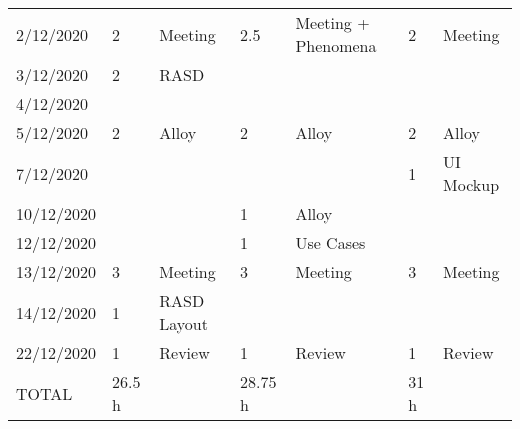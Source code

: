 \begin{table}[h]
{\begin{tabular}{|l|l|p{2.5cm}|l|p{2.5cm}|l|p{2.5cm}|}
2/12/2020& 2& Meeting& 2.5& Meeting + Phenomena& 2& Meeting\\
3/12/2020& 2& RASD &&&&\\
4/12/2020&&&&&&\\
5/12/2020& 2& Alloy& 2& Alloy& 2& Alloy\\
7/12/2020&&&&& 1& UI Mockup\\
10/12/2020&&& 1& Alloy&&\\
12/12/2020&&& 1& Use Cases&&\\
13/12/2020& 3& Meeting& 3& Meeting& 3& Meeting\\
14/12/2020& 1& RASD Layout&&&&\\
22/12/2020& 1& Review& 1& Review& 1& Review\\
\hline
TOTAL& 26.5 h&& 28.75 h && 31 h&\\
\hline
\end{tabular}
}
\end{table}